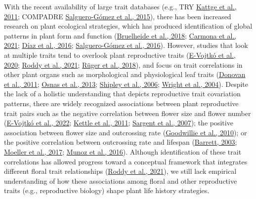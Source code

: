 \documentclass[
  12pt,
  a4paper,
]{article}
\begin{document}
With the recent availability of large trait databases (e.g., TRY \protect\hyperlink{ref-kattge2011}{Kattge et al., 2011}; COMPADRE \protect\hyperlink{ref-salguero2015}{Salguero-Gómez et al., 2015}), there has been increased research on plant ecological strategies, which has produced identification of global patterns in plant form and function (\protect\hyperlink{ref-bruelheide2018}{Bruelheide et al., 2018}; \protect\hyperlink{ref-carmona2021}{Carmona et al., 2021}; \protect\hyperlink{ref-diaz2016}{Díaz et al., 2016}; \protect\hyperlink{ref-salguero2016}{Salguero-Gómez et al., 2016}). However, studies that look at multiple traits tend to overlook plant reproductive traits (\protect\hyperlink{ref-evojtko2020}{E-Vojtkó et al., 2020}; \protect\hyperlink{ref-roddy2021}{Roddy et al., 2021}; \protect\hyperlink{ref-ruger2018}{Rüger et al., 2018}), and focus on trait correlations in other plant organs such as morphological and physiological leaf traits (\protect\hyperlink{ref-donovan2011}{Donovan et al., 2011}; \protect\hyperlink{ref-osnas2013}{Osnas et al., 2013}; \protect\hyperlink{ref-shipley2006}{Shipley et al., 2006}; \protect\hyperlink{ref-wright2004}{Wright et al., 2004}). Despite the lack of a holistic understanding that depicts reproductive trait covariation patterns, there are widely recognized associations between plant reproductive trait pairs such as the negative correlation between flower size and flower number (\protect\hyperlink{ref-vojtko2022}{E-Vojtkó et al., 2022}; \protect\hyperlink{ref-kettle2011}{Kettle et al., 2011}; \protect\hyperlink{ref-sargent2007}{Sargent et al., 2007}); the positive association between flower size and outcrossing rate (\protect\hyperlink{ref-goodwillie2010}{Goodwillie et al., 2010}); or the positive correlation between outcrossing rate and lifespan (\protect\hyperlink{ref-barrett2003}{Barrett, 2003}; \protect\hyperlink{ref-moeller2017}{Moeller et al., 2017}; \protect\hyperlink{ref-munoz2016}{Munoz et al., 2016}). Although identification of these trait correlations has allowed progress toward a conceptual framework that integrates different floral trait relationships (\protect\hyperlink{ref-roddy2021}{Roddy et al., 2021}), we still lack empirical understanding of how these associations among floral and other reproductive traits (e.g., reproductive biology) shape plant life history strategies.
\end{document}
